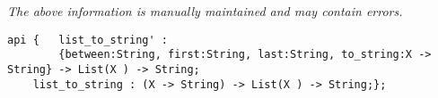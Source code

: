 \label{api:List\_To\_String}

{\tiny \it The above information is manually maintained and may contain errors.}
\begin{verbatim}
api {   list_to_string' :
        {between:String, first:String, last:String, to_string:X -> String} -> List(X ) -> String;
    list_to_string : (X -> String) -> List(X ) -> String;};
\end{verbatim}
